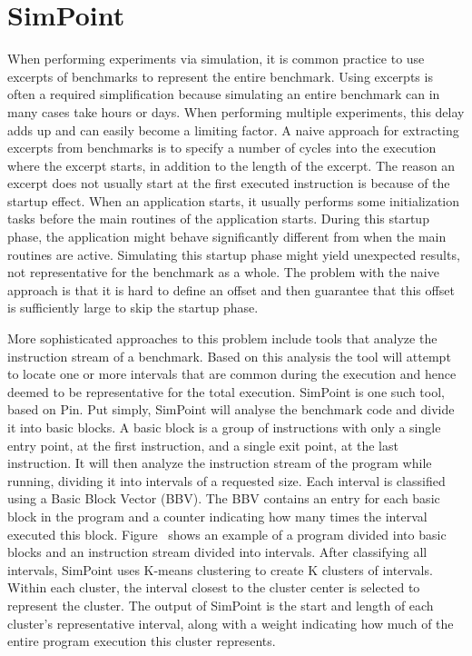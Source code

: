 \section{SimPoint}

When performing experiments via simulation, it is common practice to use excerpts of benchmarks to represent the entire benchmark.
Using excerpts is often a required simplification because simulating an entire benchmark can in many cases take hours or days.
When performing multiple experiments, this delay adds up and can easily become a limiting factor.
A naive approach for extracting excerpts from benchmarks is to specify a number of cycles into the execution where the excerpt starts, in addition to the length of the excerpt.
The reason an excerpt does not usually start at the first executed instruction is because of the startup effect.
When an application starts, it usually performs some initialization tasks before the main routines of the application starts.
During this startup phase, the application might behave significantly different from when the main routines are active.
Simulating this startup phase might yield unexpected results, not representative for the benchmark as a whole.
The problem with the naive approach is that it is hard to define an offset and then guarantee that this offset is sufficiently large to skip the startup phase.

More sophisticated approaches to this problem include tools that analyze the instruction stream of a benchmark.
Based on this analysis the tool will attempt to locate one or more intervals that are common during the execution and hence deemed to be representative for the total execution.
SimPoint is one such tool, based on Pin.
Put simply, SimPoint will analyse the benchmark code and divide it into basic blocks.
A basic block is a group of instructions with only a single entry point, at the first instruction, and a single exit point, at the last instruction.
It will then analyze the instruction stream of the program while running, dividing it into intervals of a requested size. 
Each interval is classified using a Basic Block Vector (BBV).
The BBV contains an entry for each basic block in the program and a counter indicating how many times the interval executed this block.
Figure~ shows an example of a program divided into basic blocks and an instruction stream divided into intervals.
After classifying all intervals, SimPoint uses K-means clustering to create K clusters of intervals. 
Within each cluster, the interval closest to the cluster center is selected to represent the cluster. 
The output of SimPoint is the start and length of each cluster's representative interval, along with a weight indicating how much of the entire program execution this cluster represents.

